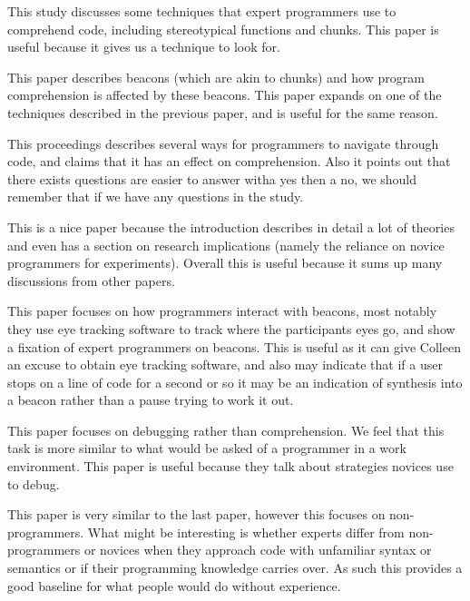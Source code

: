 \documentclass{article}
\begin{document}
This study discusses some techniques that expert programmers use to comprehend code, including stereotypical functions and chunks. This paper is useful because it gives us a technique to look for. \cite{soloway1984}

This paper describes beacons (which are akin to chunks) and how program comprehension is affected by these beacons. This paper expands on one of the techniques described in the previous paper, and is useful for the same reason. \cite{wiedenbeck1991}

This proceedings describes several ways for programmers to navigate through code, and claims that it has an effect on comprehension. Also it points out that there exists questions are easier to answer witha yes then a no, we should remember that if we have any questions in the study. \cite{mosemann2001}

This is a nice paper because the introduction describes in detail a lot of theories and even has a section on research implications (namely the reliance on novice programmers for experiments). Overall this is useful because it sums up many discussions from other papers. \cite{storey2005}

This paper focuses on how programmers interact with beacons, most notably they use eye tracking software to track where the participants eyes go, and show a fixation of expert programmers on beacons.
This is useful as it can give Colleen an excuse to obtain eye tracking software, and also may indicate that if a user stops on a line of code for a second or so it may be an indication of synthesis into a beacon rather than a pause trying to work it out. \cite{aschwanden2006}

This paper focuses on debugging rather than comprehension. We feel that this task is more similar to what would be asked of a programmer in a work environment.
This paper is useful because they talk about strategies novices use to debug. \cite{fitzgerald}

This paper is very similar to the last paper, however this focuses on non-programmers.
What might be interesting is whether experts differ from non-programmers or novices when they approach code with unfamiliar syntax or semantics or if their programming knowledge carries over.
As such this provides a good baseline for what people would do without experience.
\cite{gross2009}


\end{document}
